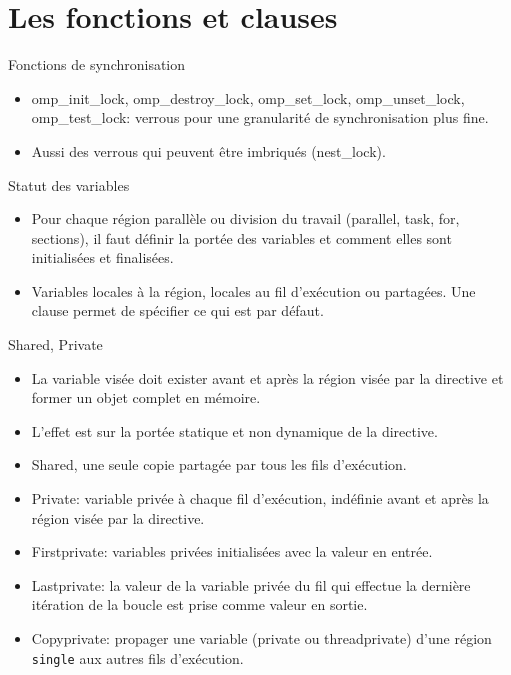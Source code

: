 \documentclass[10pt]{beamer}
\begin{document}
\section{Les fonctions et clauses}

\begin{frame}{Fonctions de synchronisation}

  \begin{itemize}
    \item omp\_init\_lock, omp\_destroy\_lock, omp\_set\_lock, omp\_unset\_lock, omp\_test\_lock: verrous pour une granularité de synchronisation plus fine.

    \item Aussi des verrous qui peuvent être imbriqués (nest\_lock).
  \end{itemize}
\end{frame}

\begin{frame}{Statut des variables}

  \begin{itemize}
    \item Pour chaque région parallèle ou division du travail (parallel, task, for, sections), il faut définir la portée des variables et comment elles sont initialisées et finalisées.

    \item Variables locales à la région, locales au fil d'exécution ou partagées. Une clause permet de spécifier ce qui est par défaut. 
  \end{itemize}
\end{frame}

\begin{frame}{Shared, Private}

  \begin{itemize}
    \item La variable visée doit exister avant et après la région visée par la directive et former un objet complet en mémoire.

    \item L'effet est sur la portée statique et non dynamique de la directive.

    \item Shared, une seule copie partagée par tous les fils d'exécution.

    \item Private: variable privée à chaque fil d'exécution, indéfinie avant et après la région visée par la directive.

    \item Firstprivate: variables privées initialisées avec la valeur en entrée.

    \item Lastprivate: la valeur de la variable privée du fil qui effectue la dernière itération de la boucle est prise comme valeur en sortie.

    \item Copyprivate: propager une variable (private ou threadprivate) d'une région \texttt{single} aux autres fils d'exécution. 
  \end{itemize}
\end{frame}
\end{document}
